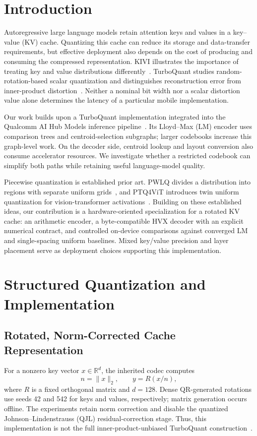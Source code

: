 \documentclass[conference,a4paper,10pt]{IEEEtran}
\begin{document}
\section{Introduction}
Autoregressive large language models retain attention keys and values in a key--value (KV) cache. Quantizing this cache can reduce its storage and data-transfer requirements, but effective deployment also depends on the cost of producing and consuming the compressed representation. KIVI illustrates the importance of treating key and value distributions differently~\cite{kivi}. TurboQuant studies random-rotation-based scalar quantization and distinguishes reconstruction error from inner-product distortion~\cite{turboquant}. Neither a nominal bit width nor a scalar distortion value alone determines the latency of a particular mobile implementation.

Our work builds upon a TurboQuant implementation integrated into the Qualcomm AI Hub Models inference pipeline~\cite{artifact}. Its Lloyd--Max (LM) encoder uses comparison trees and centroid-selection subgraphs; larger codebooks increase this graph-level work. On the decoder side, centroid lookup and layout conversion also consume accelerator resources. We investigate whether a restricted codebook can simplify both paths while retaining useful language-model quality.

Piecewise quantization is established prior art. PWLQ divides a distribution into regions with separate uniform grids~\cite{pwlq}, and PTQ4ViT introduces twin uniform quantization for vision-transformer activations~\cite{ptq4vit}. Building on these established ideas, our contribution is a hardware-oriented specialization for a rotated KV cache: an arithmetic encoder, a byte-compatible HVX decoder with an explicit numerical contract, and controlled on-device comparisons against converged LM and single-spacing uniform baselines. Mixed key/value precision and layer placement serve as deployment choices supporting this implementation.

\section{Structured Quantization and Implementation}
\subsection{Rotated, Norm-Corrected Cache Representation}
For a nonzero key vector $x\in\mathbb{R}^{d}$, the inherited codec computes
\begin{equation}
 n=\lVert x\rVert_2,\qquad y=R(x/n),
 \label{eq:rotation}
\end{equation}
where $R$ is a fixed orthogonal matrix and $d=128$. Dense QR-generated rotations use seeds 42 and 542 for keys and values, respectively; matrix generation occurs offline. The experiments retain norm correction and disable the quantized Johnson--Lindenstrauss (QJL) residual-correction stage. Thus, this implementation is not the full inner-product-unbiased TurboQuant construction~\cite{turboquant}.
\end{document}

